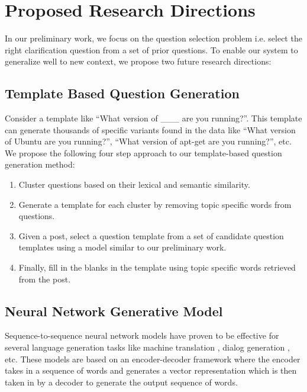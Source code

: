 \documentclass[11pt,a4paper]{article}
\begin{document}
\section{Proposed Research Directions}

In our preliminary work, we focus on the question selection problem i.e. select the right clarification question from a set of prior questions.
To enable our system to generalize well to new context, we propose two future research directions:

\subsection{Template Based Question Generation}

 Consider a template like ``What version of \_\_\_  are you running?''. This template can generate thousands of specific variants found in the data like ``What version of Ubuntu are you running?'',  ``What version of apt-get are you running?'', etc. We propose the following four step approach to our template-based question generation method:

\begin{enumerate} 
\item Cluster questions based on their lexical and semantic similarity. %
\item Generate a template for each cluster by removing topic specific words from questions.
\item Given a post, select a question template from a set of candidate question templates using a model similar to our preliminary work.
\item Finally, fill in the blanks in the template using topic specific words retrieved from the post. 
\end{enumerate}

\subsection{Neural Network Generative Model}
  
Sequence-to-sequence neural network models have proven to be effective for several language generation tasks like machine translation \cite{sutskever2014sequence}, dialog generation \cite{serban2016building}, etc. These models are based on an encoder-decoder framework where the encoder takes in a sequence of words and generates a vector representation which is then taken in by a decoder to generate the output sequence of words.
\end{document}
